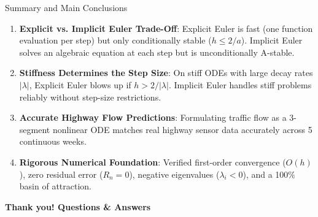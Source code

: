 \documentclass[aspectratio=169,10pt]{beamer}
\begin{document}
\begin{frame}{Summary and Main Conclusions}
  \begin{enumerate}
    \item \textbf{Explicit vs. Implicit Euler Trade-Off}:
    Explicit Euler is fast (one function evaluation per step) but only conditionally stable ($h \le 2/a$). Implicit Euler solves an algebraic equation at each step but is unconditionally A-stable.

    \item \textbf{Stiffness Determines the Step Size}:
    On stiff ODEs with large decay rates $|\lambda|$, Explicit Euler blows up if $h > 2/|\lambda|$. Implicit Euler handles stiff problems reliably without step-size restrictions.

    \item \textbf{Accurate Highway Flow Predictions}:
    Formulating traffic flow as a 3-segment nonlinear ODE matches real highway sensor data accurately across 5 continuous weeks.

    \item \textbf{Rigorous Numerical Foundation}:
    Verified first-order convergence ($O(h)$), zero residual error ($R_n = 0$), negative eigenvalues ($\lambda_i < 0$), and a 100\% basin of attraction.
  \end{enumerate}

  \vspace{0.4cm}
  \begin{center}
    \Large \textbf{Thank you! Questions \& Answers}
  \end{center}
\end{frame}
\end{document}
